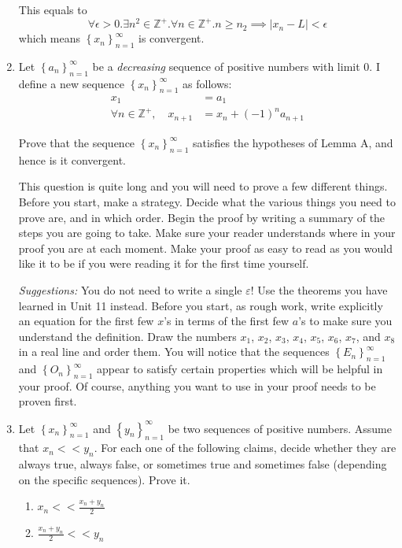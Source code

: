 \documentclass[12pt]{exam}
\newcommand {\DS} [1] {${\displaystyle #1}$}
\newcommand{\vv}{\vspace{.1cm}}
\newcommand{\Z}{\mathbb{Z}}
\newcommand{\e}{\varepsilon}
\begin{document}
\begin{enumerate}
This equals to
$$
\forall \epsilon > 0. \exists n^2\in\Z^+.\forall n \in \Z^+. n \geq n_2 \implies | x_n - L | < \epsilon
$$
which means \DS{\left\{x_n\right\}_{n=1}^{\infty}} is convergent.

\newpage

\item Let \DS{\left\{a_n\right\}_{n=1}^{\infty}} be a \emph{decreasing} sequence of positive numbers with limit $0$.  I define a new sequence \DS{\left\{x_n\right\}_{n=1}^{\infty}} as follows:
	$$
	\begin{aligned}
		x_1 &= a_1 \\
		\forall n \in \Z^+, \quad x_{n+1} &= x_n + (-1)^n a_{n+1}
	\end{aligned}
	$$
	
	 Prove that the sequence \DS{\left\{x_n\right\}_{n=1}^{\infty}} satisfies the hypotheses of Lemma A, and hence is it convergent.

	This question is quite long and you will need to prove a few different things.  Before you start, make a strategy.  Decide what the various things you need to prove are, and in which order.  Begin the proof by writing a summary of the steps you are going to take.  Make sure your reader understands where in your proof you are at each moment.  Make your proof as easy to read as you would like it to be if you were reading it for the first time yourself.
		 
	 \emph{Suggestions:}  You do not need to write a single $\e$!  Use the theorems you have learned in Unit 11 instead.
	 Before you start, as rough work, write explicitly an equation for the first few $x$'s in terms of the first few $a$'s to make sure you understand the definition.  Draw the numbers $x_1$, $x_2$, $x_3$, $x_4$, $x_5$, $x_6$, $x_7$, and $x_8$ in a real line and order them.   You will notice that the sequences \DS{\left\{E_n\right\}_{n=1}^{\infty}}  and \DS{\left\{O_n\right\}_{n=1}^{\infty}} appear to satisfy certain properties which will be helpful in your proof.  Of course, anything you want to use in your proof needs to be proven first.
	
\vv

\item Let \DS{\left\{x_n\right\}_{n=1}^{\infty}} and \DS{\left\{y_n\right\}_{n=1}^{\infty}} be two sequences of positive numbers.  Assume that \DS{x_n << y_n}. 
	For each one of the following claims, decide whether they are always true, always false, or sometimes true and sometimes false (depending on the specific sequences).  Prove it.
	\begin{enumerate}
		\item \DS{x_n << \frac{x_n+y_n}{2}}
		\item \DS{\frac{x_n+y_n}{2} << y_n}
	\end{enumerate}

\end{enumerate}
\end{document}

